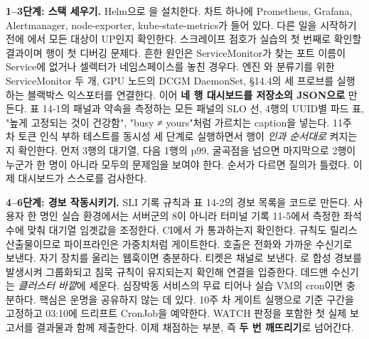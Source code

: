\textbf{1–3단계: 스택 세우기.} Helm으로 을 설치한다. 차트 하나에 Prometheus, Grafana, Alertmanager, node-exporter, kube-state-metrics가 들어 있다. 다른 일을 시작하기 전에 에서 모든 대상이 UP인지 확인한다. 스크레이프 점호가 실습의 첫 번째로 확인할 결과이며  행이 첫 디버깅 문제다. 흔한 원인은 ServiceMonitor가 찾는 포트 이름이 Service에 없거나 셀렉터가 네임스페이스를 놓친 경우다. 엔진 와 분류기를 위한 ServiceMonitor 두 개, GPU 노드의 DCGM DaemonSet, §14.4의 세 프로브를 실행하는 블랙박스 익스포터를 연결한다. 이어 \textbf{네 행 대시보드를 저장소의 JSON으로} 만든다. 표 14-1의 패널과 약속을 측정하는 모든 패널의 SLO 선, 4행의 UUID별 파드 표, "높게 고정되는 것이 건강함", "busy ≠ yours"처럼 가르치는 caption을 넣는다. 11주 차 토큰 인식 부하 테스트를 동시성 세 단계로 실행하면서 행이 \textit{인과 순서대로} 켜지는지 확인한다. 먼저 3행의 대기열, 다음 1행의 p99, 굴곡점을 넘으면 마지막으로 2행이 누군가 한 명이 아니라 모두의 문제임을 보여야 한다. 순서가 다르면 질의가 틀렸다. 이제 대시보드가 스스로를 검사한다.

\textbf{4–6단계: 경보 작동시키기.} SLI 기록 규칙과 표 14-2의 경보 목록을 코드로 만든다. 사용자 한 명인 실습 환경에서는 서버군의 8이 아니라 터미널 기록 11-5에서 측정한 좌석 수에 맞춰 대기열 임곗값을 조정한다. CI에서 가 통과하는지 확인한다. 규칙도 릴리스 산출물이므로 파이프라인은 가중치처럼 게이트한다. 호출은 전화와 가까운 수신기로 보낸다. 자기 장치를 울리는 웹훅이면 충분하다. 티켓은 채널로 보낸다. 로 합성 경보를 발생시켜 그룹화되고 침묵 규칙이 유지되는지 확인해 연결을 입증한다. 데드맨 수신기는 \textit{클러스터 바깥}에 세운다. 심장박동 서비스의 무료 티어나 실습 VM의 cron이면 충분하다. 핵심은 운명을 공유하지 않는 데 있다. 10주 차 게이트 실행으로 기준 구간을 고정하고 03:10에 드리프트 CronJob을 예약한다. WATCH 판정을 포함한 첫 실제 보고서를 결과물과 함께 제출한다. 이제 채점하는 부분, 즉 \textbf{두 번 깨뜨리기}로 넘어간다.


